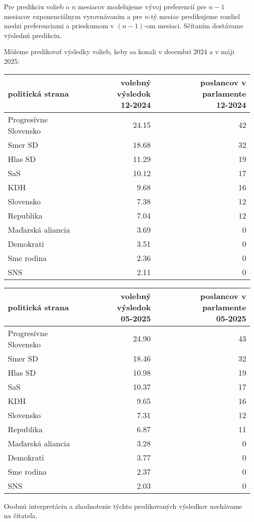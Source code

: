 \documentclass[main.tex]{subfiles}
\begin{document}
Pre predikciu volieb o $n$ mesiacov modelujeme vývoj preferencií pre $n-1$ mesiacov exponenciálnym vyrovnávaním a pre $n$-tý mesiac predikujeme rozdiel medzi preferenciami a prieskumom v $(n-1)$-om mesiaci. Sčítaním dostávame výslednú predikciu.


Môžeme predikovať výsledky volieb, keby sa konali v decembri 2024 a v máji 2025:

\begin{center}
	\small
\begin{tabular}{lrr}
	\toprule
	politická strana &  \parbox{3.5cm}{\raggedleft volebný výsledok \\ 12-2024} & \parbox{5cm}{\raggedleft poslancov v parlamente \\ 12-2024} \\
	\midrule
	Progresívne Slovensko & 24.15 & 42 \\
	Smer SD & 18.68 & 32 \\
	Hlas SD & 11.29 & 19 \\
	SaS & 10.12 & 17 \\
	KDH & 9.68 & 16 \\
	Slovensko & 7.38 & 12 \\
	Republika & 7.04 & 12 \\
	Maďarská aliancia & 3.69 & 0 \\
	Demokrati & 3.51 & 0 \\
	Sme rodina & 2.36 & 0 \\
	SNS & 2.11 & 0 \\
	\bottomrule
\end{tabular}

\begin{tabular}{lrr}
	\toprule
	politická strana &  \parbox{3.5cm}{\raggedleft volebný výsledok \\ 05-2025} & \parbox{5cm}{\raggedleft poslancov v parlamente \\ 05-2025} \\
	\midrule
	Progresívne Slovensko & 24.90 & 43 \\
	Smer SD & 18.46 & 32 \\
	Hlas SD & 10.98 & 19 \\
	SaS & 10.37 & 17 \\
	KDH & 9.65 & 16 \\
	Slovensko & 7.31 & 12 \\
	Republika & 6.87 & 11 \\
	Maďarská aliancia & 3.28 & 0 \\
	Demokrati & 3.77 & 0 \\
	Sme rodina & 2.37 & 0 \\
	SNS & 2.03 & 0 \\
	\bottomrule
\end{tabular}
\end{center}

Osobnú interpretáciu a zhodnotenie týchto predikovaných výsledkov nechávame na čitateľa.
	
\end{document}
